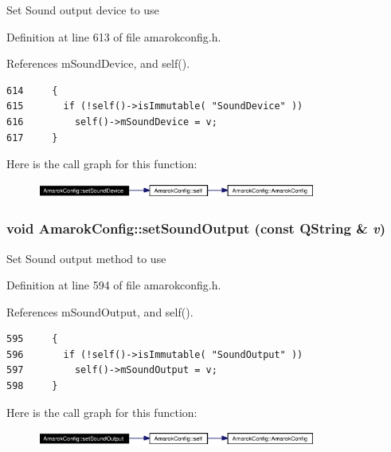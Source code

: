Set Sound output device to use 

Definition at line 613 of file amarokconfig.h.

References m\-Sound\-Device, and self().



\footnotesize\begin{verbatim}614     {
615       if (!self()->isImmutable( "SoundDevice" ))
616         self()->mSoundDevice = v;
617     }
\end{verbatim}\normalsize 


Here is the call graph for this function:\begin{figure}[H]
\begin{center}
\leavevmode
\includegraphics[width=260pt]{classAmarokConfig_AmarokConfige63_cgraph}
\end{center}
\end{figure}
\subsubsection{\setlength{\rightskip}{0pt plus 5cm}void Amarok\-Config::set\-Sound\-Output (const QString \& {\em v})\hspace{0.3cm}{\tt  [inline, static]}}\label{classAmarokConfig_AmarokConfige61}


Set Sound output method to use 

Definition at line 594 of file amarokconfig.h.

References m\-Sound\-Output, and self().



\footnotesize\begin{verbatim}595     {
596       if (!self()->isImmutable( "SoundOutput" ))
597         self()->mSoundOutput = v;
598     }
\end{verbatim}\normalsize 


Here is the call graph for this function:\begin{figure}[H]
\begin{center}
\leavevmode
\includegraphics[width=260pt]{classAmarokConfig_AmarokConfige61_cgraph}
\end{center}
\end{figure}
